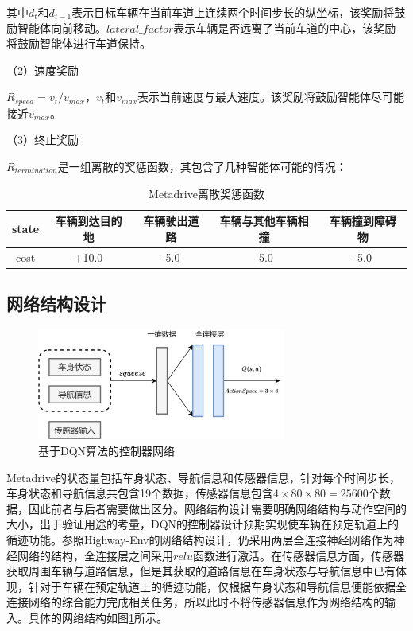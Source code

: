 其中$d_t$和$d_{t-1}$表示目标车辆在当前车道上连续两个时间步长的纵坐标，该奖励将鼓励智能体向前移动。$lateral\_factor$表示车辆是否远离了当前车道的中心，该奖励将鼓励智能体进行车道保持。

（2）速度奖励

$R_{speed} = v_t / v_{max}$，$v_t$和$v_{max}$表示当前速度与最大速度。该奖励将鼓励智能体尽可能接近$v_{max}$。

（3）终止奖励

$R_{termination}$是一组离散的奖惩函数，其包含了几种智能体可能的情况：
\begin{table}[htbp]
    \caption{Metadrive离散奖惩函数}\label{Metadrive离散奖惩函数}
    \centering
    \renewcommand\arraystretch{1.5}
    \begin{tabular}{ccccc}
    \toprule %
    state & 车辆到达目的地 & 车辆驶出道路 & 车辆与其他车辆相撞 & 车辆撞到障碍物 \\ \hline
    cost  & +10.0   & -5.0   & -5.0      & -5.0    \\ 
    \bottomrule %
    \end{tabular}
\end{table}

\subsection{网络结构设计} %

\begin{figure}[htbp]
    \vspace{13pt}
    \centering
    \includegraphics[width=0.73\textwidth]{images/chapter3/metadrive_control.png}
    \caption{基于DQN算法的控制器网络}\label{DQN算法的控制器网络} %
\end{figure}  

Metadrive的状态量包括车身状态、导航信息和传感器信息，针对每个时间步长，车身状态和导航信息共包含19个数据，传感器信息包含$4\times80\times80=25600$个数据，因此前者与后者需要做出区分。网络结构设计需要明确网络结构与动作空间的大小，出于验证用途的考量，DQN的控制器设计预期实现使车辆在预定轨道上的循迹功能。参照Highway-Env的网络结构设计，仍采用两层全连接神经网络作为神经网络的结构，全连接层之间采用$relu$函数进行激活。在传感器信息方面，传感器获取周围车辆与道路信息，但是其获取的道路信息在车身状态与导航信息中已有体现，针对于车辆在预定轨道上的循迹功能，仅根据车身状态和导航信息便能依据全连接网络的综合能力完成相关任务，所以此时不将传感器信息作为网络结构的输入。具体的网络结构如图\ref{DQN算法的控制器网络}所示。

